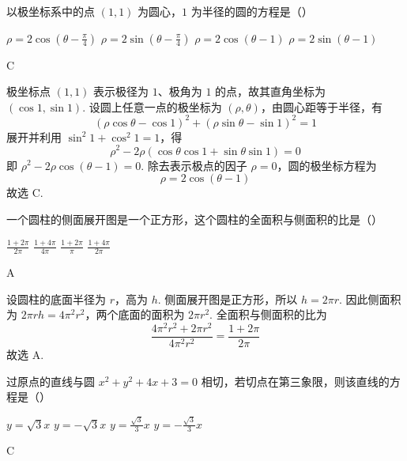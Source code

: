\begin{problem}
以极坐标系中的点 \((1,1)\) 为圆心，\(1\) 为半径的圆的方程是（\quad）

\choices
    {\(\rho=2\cos\left(\theta-\frac{\pi}{4}\right)\)}
    {\(\rho=2\sin\left(\theta-\frac{\pi}{4}\right)\)}
    {\(\rho=2\cos\left(\theta-1\right)\)}
    {\(\rho=2\sin\left(\theta-1\right)\)}
\end{problem}

\begin{answer}
C
\end{answer}

\begin{solution}
极坐标点 \((1,1)\) 表示极径为 \(1\)、极角为 \(1\) 的点，故其直角坐标为 \((\cos1,\sin1)\). 设圆上任意一点的极坐标为 \((\rho,\theta)\)，由圆心距等于半径，有
\[
(\rho\cos\theta-\cos1)^2+(\rho\sin\theta-\sin1)^2=1
\]
展开并利用 \(\sin^2 1+\cos^2 1=1\)，得
\[
\rho^2-2\rho(\cos\theta\cos1+\sin\theta\sin1)=0
\]
即 \(\rho^2-2\rho\cos(\theta-1)=0\). 除去表示极点的因子 \(\rho=0\)，圆的极坐标方程为
\[
\rho=2\cos(\theta-1)
\]
故选 C.
\end{solution}

\begin{problem}
一个圆柱的侧面展开图是一个正方形，这个圆柱的全面积与侧面积的比是（\quad）

\choices
    {\(\frac{1+2\pi}{2\pi}\)}
    {\(\frac{1+4\pi}{4\pi}\)}
    {\(\frac{1+2\pi}{\pi}\)}
    {\(\frac{1+4\pi}{2\pi}\)}
\end{problem}

\begin{answer}
A
\end{answer}

\begin{solution}
设圆柱的底面半径为 \(r\)，高为 \(h\). 侧面展开图是正方形，所以 \(h=2\pi r\). 因此侧面积为 \(2\pi rh=4\pi^2r^2\)，两个底面的面积为 \(2\pi r^2\). 全面积与侧面积的比为
\[
\frac{4\pi^2r^2+2\pi r^2}{4\pi^2r^2}
=\frac{1+2\pi}{2\pi}
\]
故选 A.
\end{solution}

\begin{problem}
过原点的直线与圆 \(x^2+y^2+4x+3=0\) 相切，若切点在第三象限，则该直线的方程是（\quad）

\choices
    {\(y=\sqrt{3}x\)}
    {\(y=-\sqrt{3}x\)}
    {\(y=\frac{\sqrt{3}}{3}x\)}
    {\(y=-\frac{\sqrt{3}}{3}x\)}
\end{problem}

\begin{answer}
C
\end{answer}

